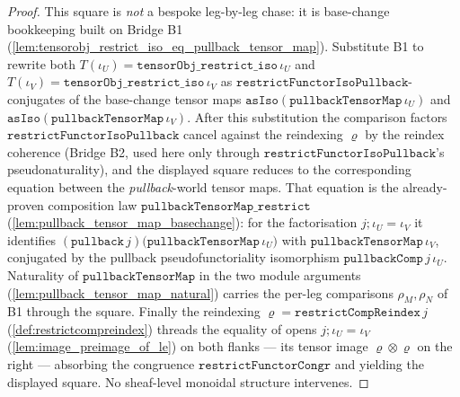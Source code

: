 \begin{proof}
  This square is \emph{not} a bespoke leg-by-leg chase: it is base-change bookkeeping built on
  Bridge B1 (\cref{lem:tensorobj_restrict_iso_eq_pullback_tensor_map}). Substitute B1 to rewrite
  both \(T(\iota_U) = \mathtt{tensorObj\_restrict\_iso}\,\iota_U\) and
  \(T(\iota_V) = \mathtt{tensorObj\_restrict\_iso}\,\iota_V\) as
  \(\mathtt{restrictFunctorIsoPullback}\)-conjugates of the base-change tensor maps
  \(\mathtt{asIso}(\mathtt{pullbackTensorMap}\,\iota_U)\) and
  \(\mathtt{asIso}(\mathtt{pullbackTensorMap}\,\iota_V)\). After this substitution the comparison
  factors \(\mathtt{restrictFunctorIsoPullback}\) cancel against the reindexing \(\varrho\) by the
  reindex coherence (Bridge B2, used here only through
  \(\mathtt{restrictFunctorIsoPullback}\)'s pseudonaturality), and the displayed square reduces to
  the corresponding equation between the \emph{pullback}-world tensor maps. That equation is the
  already-proven composition law \(\mathtt{pullbackTensorMap\_restrict}\)
  (\cref{lem:pullback_tensor_map_basechange}): for the factorisation
  \(j \mathbin{;} \iota_U = \iota_V\) it identifies
  \((\mathtt{pullback}\,j)\bigl(\mathtt{pullbackTensorMap}\,\iota_U\bigr)\) with
  \(\mathtt{pullbackTensorMap}\,\iota_V\), conjugated by the pullback pseudofunctoriality
  isomorphism \(\mathtt{pullbackComp}\,j\,\iota_U\). Naturality of \(\mathtt{pullbackTensorMap}\) in
  the two module arguments (\cref{lem:pullback_tensor_map_natural}) carries the per-leg comparisons
  \(\rho_M, \rho_N\) of B1 through the square. Finally the reindexing
  \(\varrho = \mathtt{restrictCompReindex}\,j\) (\cref{def:restrictcompreindex}) threads the
  equality of opens \(j \mathbin{;} \iota_U = \iota_V\) (\cref{lem:image_preimage_of_le}) on both
  flanks --- its tensor image \(\varrho \otimes \varrho\) on the right --- absorbing the
  congruence \(\mathtt{restrictFunctorCongr}\) and yielding the displayed square. No sheaf-level
  monoidal structure intervenes.
\end{proof}

